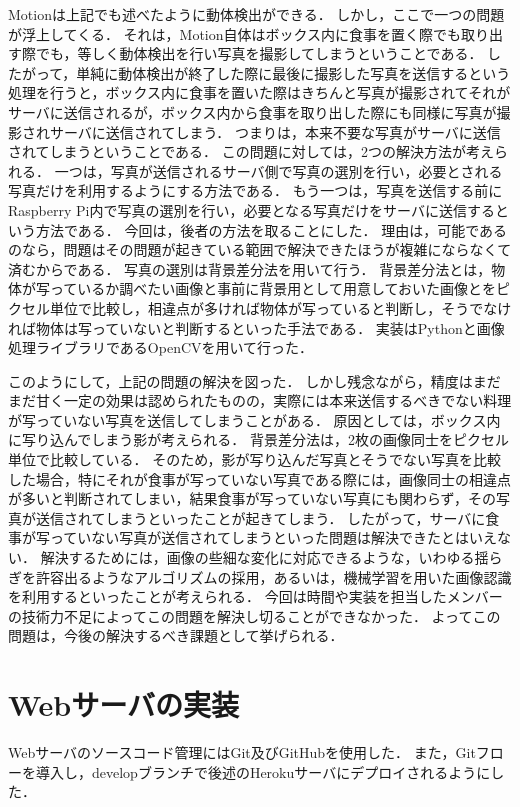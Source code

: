 \documentclass[../report]{subfiles}
\begin{document}
Motionは上記でも述べたように動体検出ができる．
しかし，ここで一つの問題が浮上してくる．
それは，Motion自体はボックス内に食事を置く際でも取り出す際でも，等しく動体検出を行い写真を撮影してしまうということである．
したがって，単純に動体検出が終了した際に最後に撮影した写真を送信するという処理を行うと，ボックス内に食事を置いた際はきちんと写真が撮影されてそれがサーバに送信されるが，ボックス内から食事を取り出した際にも同様に写真が撮影されサーバに送信されてしまう．
つまりは，本来不要な写真がサーバに送信されてしまうということである．
この問題に対しては，2つの解決方法が考えられる．
一つは，写真が送信されるサーバ側で写真の選別を行い，必要とされる写真だけを利用するようにする方法である．
もう一つは，写真を送信する前にRaspberry Pi内で写真の選別を行い，必要となる写真だけをサーバに送信するという方法である．
今回は，後者の方法を取ることにした．
理由は，可能であるのなら，問題はその問題が起きている範囲で解決できたほうが複雑にならなくて済むからである．
写真の選別は背景差分法を用いて行う．
背景差分法とは，物体が写っているか調べたい画像と事前に背景用として用意しておいた画像とをピクセル単位で比較し，相違点が多ければ物体が写っていると判断し，そうでなければ物体は写っていないと判断するといった手法である．
実装はPythonと画像処理ライブラリであるOpenCVを用いて行った．

このようにして，上記の問題の解決を図った．
しかし残念ながら，精度はまだまだ甘く一定の効果は認められたものの，実際には本来送信するべきでない料理が写っていない写真を送信してしまうことがある．
原因としては，ボックス内に写り込んでしまう影が考えられる．
背景差分法は，2枚の画像同士をピクセル単位で比較している．
そのため，影が写り込んだ写真とそうでない写真を比較した場合，特にそれが食事が写っていない写真である際には，画像同士の相違点が多いと判断されてしまい，結果食事が写っていない写真にも関わらず，その写真が送信されてしまうといったことが起きてしまう．
したがって，サーバに食事が写っていない写真が送信されてしまうといった問題は解決できたとはいえない．
解決するためには，画像の些細な変化に対応できるような，いわゆる揺らぎを許容出るようなアルゴリズムの採用，あるいは，機械学習を用いた画像認識を利用するといったことが考えられる．
今回は時間や実装を担当したメンバーの技術力不足によってこの問題を解決し切ることができなかった．
よってこの問題は，今後の解決するべき課題として挙げられる．


\section{Webサーバの実装}
Webサーバのソースコード管理にはGit及びGitHubを使用した．
また，Gitフローを導入し，developブランチで後述のHerokuサーバにデプロイされるようにした．
\end{document}
